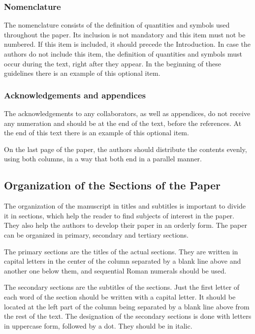 \documentclass[english]{cobep-spec}
\begin{document}
\subsubsection{Nomenclature}

The nomenclature consists of the definition of quantities and symbols used throughout the paper. Its inclusion is not mandatory and this item must not be numbered. If this item is included, it should precede the Introduction. In case the authors do not include this item, the  definition of quantities and symbols must occur during the text, right after they appear. In the beginning of these guidelines there is an example of this optional item.

\subsubsection{Acknowledgements and appendices}

The acknowledgements to any collaborators, as well as appendices, do not receive any numeration and should be at the end of the text, before the references. At the end of this text there is an example of this optional item.

On the last page of the paper, the authors should distribute the contents evenly, using both columns, in a way that both end in a parallel manner.

\subsection{Organization of the Sections of the Paper}

The organization of the manuscript in titles and subtitles is important to divide it in sections, which help the reader to find subjects of interest in the paper. They also help the authors to develop their paper in an orderly form. The paper can be organized in primary, secondary and tertiary sections.

The primary sections are the titles of the actual sections. They are written in capital letters in the center of the column separated by a blank line above and another one below them, and sequential Roman numerals should be used.

The secondary sections are the subtitles of the sections. Just the first letter of each word of the section should be written with a capital letter. It should be located at the left part of the column being separated by a blank line above from the rest of the text. The designation of the secondary sections is done with letters in uppercase form, followed by a dot. They should be in italic.
\end{document}
